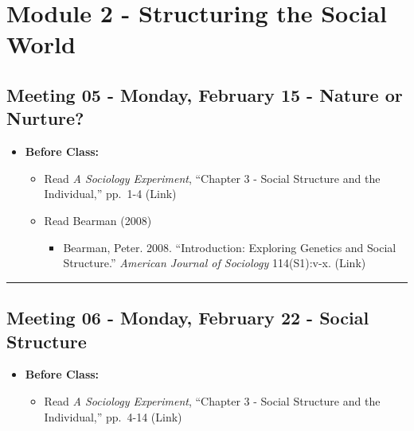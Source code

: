 \documentclass[
]{book}
\providecommand{\tightlist}{%
  \setlength{\itemsep}{0pt}\setlength{\parskip}{0pt}}
\begin{document}
\newpage

\hypertarget{module-2---structuring-the-social-world}{%
\section{Module 2 - Structuring the Social World}\label{module-2---structuring-the-social-world}}

\hypertarget{meeting-05---monday-february-15---nature-or-nurture}{%
\subsection*{Meeting 05 - Monday, February 15 - Nature or Nurture?}\label{meeting-05---monday-february-15---nature-or-nurture}}

\begin{itemize}
\tightlist
\item
  \textbf{Before Class:}

  \begin{itemize}
  \tightlist
  \item
    Read \emph{A Sociology Experiment}, ``Chapter 3 - Social Structure and the Individual,'' pp.~1-4 (Link)
  \item
    Read Bearman (2008)

    \begin{itemize}
    \tightlist
    \item
      Bearman, Peter. 2008. ``Introduction: Exploring Genetics and Social Structure.'' \emph{American Journal of Sociology} 114(S1):v-x. (Link)
    \end{itemize}
  \end{itemize}
\end{itemize}

\begin{center}\rule{0.5\linewidth}{0.5pt}\end{center}

\hypertarget{meeting-06---monday-february-22---social-structure}{%
\subsection*{Meeting 06 - Monday, February 22 - Social Structure}\label{meeting-06---monday-february-22---social-structure}}

\begin{itemize}
\tightlist
\item
  \textbf{Before Class:}

  \begin{itemize}
  \tightlist
  \item
    Read \emph{A Sociology Experiment}, ``Chapter 3 - Social Structure and the Individual,'' pp.~4-14 (Link)
  \end{itemize}
\end{itemize}
\end{document}
